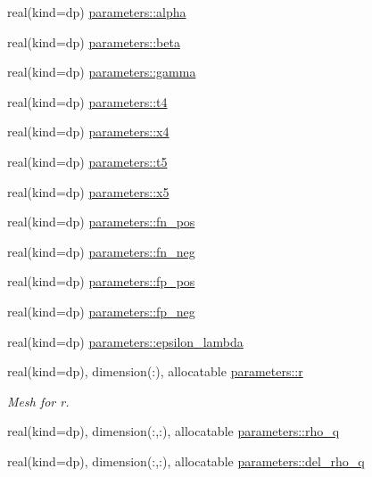 \begin{DoxyCompactItemize}
\item 
real(kind=dp) \mbox{\hyperlink{group__BSK__EXTRA__PARS_ga8490c300b1682aacdb076ab6349e11b0}{parameters\+::alpha}}
\item 
real(kind=dp) \mbox{\hyperlink{group__BSK__EXTRA__PARS_ga7c930f664bb545cbbdf20ca315bd20d8}{parameters\+::beta}}
\item 
real(kind=dp) \mbox{\hyperlink{group__BSK__EXTRA__PARS_ga1baca96d21c6817998a6c1bfadb8645b}{parameters\+::gamma}}
\item 
real(kind=dp) \mbox{\hyperlink{group__BSK__EXTRA__PARS_ga8e9070bc00ffb35cb30d29a2cdb4cb7d}{parameters\+::t4}}
\item 
real(kind=dp) \mbox{\hyperlink{group__BSK__EXTRA__PARS_ga48ff3471242a75ae841f4090057d5dda}{parameters\+::x4}}
\item 
real(kind=dp) \mbox{\hyperlink{group__BSK__EXTRA__PARS_gacca0e8bacd6526d5199e62df3e41b416}{parameters\+::t5}}
\item 
real(kind=dp) \mbox{\hyperlink{group__BSK__EXTRA__PARS_gac03740f2430e82863d9084708f78d297}{parameters\+::x5}}
\item 
real(kind=dp) \mbox{\hyperlink{group__BSK__EXTRA__PARS_ga6fd9de4a6f08fe29d2edb25db8ff5b9a}{parameters\+::fn\+\_\+pos}}
\item 
real(kind=dp) \mbox{\hyperlink{group__BSK__EXTRA__PARS_ga00dd6368c3084b28b39f9ca851465592}{parameters\+::fn\+\_\+neg}}
\item 
real(kind=dp) \mbox{\hyperlink{group__BSK__EXTRA__PARS_ga5e544dc32f83cdba34677a29c028ef40}{parameters\+::fp\+\_\+pos}}
\item 
real(kind=dp) \mbox{\hyperlink{group__BSK__EXTRA__PARS_ga6ed17804a32c9e04ddd4c244258b8610}{parameters\+::fp\+\_\+neg}}
\item 
real(kind=dp) \mbox{\hyperlink{group__BSK__EXTRA__PARS_ga383b5412e8499ce22ba113c539966123}{parameters\+::epsilon\+\_\+lambda}}
\item 
real(kind=dp), dimension(\+:), allocatable \mbox{\hyperlink{group__MESH_gab0ff28e85164200c8d56a8097bb2fe54}{parameters\+::r}}
\begin{DoxyCompactList}\small\item\em Mesh for r. \end{DoxyCompactList}\item 
real(kind=dp), dimension(\+:,\+:), allocatable \mbox{\hyperlink{group__DENSITIES_ga75b48fc89c0f01176fd8c58ced2979a8}{parameters\+::rho\+\_\+q}}
\item 
real(kind=dp), dimension(\+:,\+:), allocatable \mbox{\hyperlink{group__DENSITIES_ga8a7e7d5715287b287f2153291460783b}{parameters\+::del\+\_\+rho\+\_\+q}}

\end{DoxyCompactItemize}
